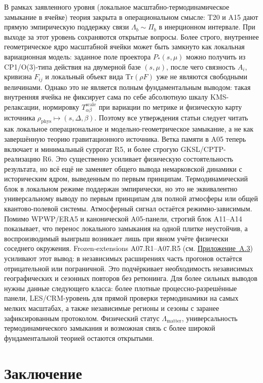 \documentclass[11pt,a4paper]{article}
\theoremstyle{definition}
\theoremstyle{plain}
\theoremstyle{remark}
\begin{document}
В рамках заявленного уровня (локальное масштабно-термодинамическое замыкание в ячейке) теория закрыта в операциональном смысле: T20 и A15 дают прямую эмпирическую поддержку связи \(\Lambda_b\sim\Pi_b\) в инерционном интервале.
При выходе за этот уровень сохраняются открытые вопросы.
Более строго, внутреннее геометрическое ядро масштабной ячейки может быть замкнуто как локальная вариационная модель: заданное поле проектора \(P_*(s,\mu)\) можно получить из CP1/O(3)-типа действия на двумерной базе \((s,\mu)\), после чего связность \(A_i\), кривизна \(F_{ij}\) и локальный объект вида \(\mathrm{Tr}(\rho F)\) уже не являются свободными величинами. Однако это не является полным фундаментальным выводом: такая внутренняя ячейка не фиксирует сама по себе абсолютную шкалу KMS-релаксации, нормировку \(T_{\alpha\beta}^{\mathrm{scale}}\) при вариации по метрике и физическую карту источника \(\rho_{\mathrm{phys}}\mapsto(s,\Delta,\beta)\). Поэтому все утверждения статьи следует читать как локальное операциональное и модельно-геометрическое замыкание, а не как завершённую теорию гравитационного источника.
Ветка памяти в A05 теперь включает и минимальный суррогат R5, и более строгую GKSL/CPTP-реализацию R6. Это существенно усиливает физическую состоятельность результата, но всё ещё не заменяет общего вывода немарковской динамики с историческим ядром, выведенным по первым принципам.
Термодинамический блок в локальном режиме поддержан эмпирически, но это не эквивалентно универсальному выводу по первым принципам для полной атмосферы или общей квантово-полевой системы.
Атмосферный сигнал остаётся режимно-зависимым. Помимо WPWP/ERA5 и канонической A05-панели, строгий блок A11--A14 показывает, что перенос локального замыкания на одной плитке неустойчив, а воспроизводимый выигрыш возникает лишь при явном учёте физически соседнего окружения. Frozen-extensions A07.R1--A07.R5 (см. \hyperref[sec:appendix:atmo]{Приложение~A.3}) усиливают этот вывод: в независимых расширениях часть прогонов остаётся отрицательной или пограничной. Это подчёркивает необходимость независимых географических и сезонных повторов без ретюнинга.
Для более сильных выводов нужны данные следующего класса: более плотные процессно-разрешённые панели, LES/CRM-уровень для прямой проверки термодинамики на самых мелких масштабах, а также независимые регионы и сезоны с заранее зафиксированным протоколом.
Физический статус $\Lambda_{\mathrm{matter}}$, универсальность термодинамического замыкания и возможная связь с более широкой фундаментальной теорией остаются открытыми.


\section{Заключение}
\label{sec:conclusion}
\end{document}
